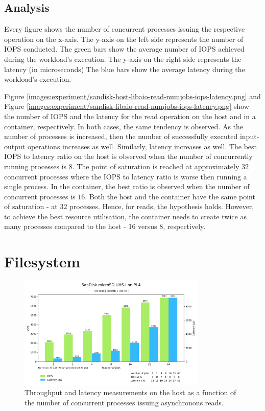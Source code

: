 \subsection{Analysis}
Every figure shows the number of concurrent processes issuing the respective operation on the 
x-axis. The y-axis on the left side represents the number of IOPS conducted. The green bars 
show the average number of IOPS achieved during the workload's execution. The y-axis on the right side 
represents the latency (in microseconds) The blue bars show the average latency during the workload's execution. 

Figure \ref{images:experiment/sandisk-host-libaio-read-numjobs-iops-latency.png} and 
Figure \ref{images:experiment/sandisk-libaio-read-numjobs-iops-latency.png} show the 
number of IOPS and the latency for the read operation on the host and in a container, respectively. 
In both cases, the same tendency is observed. As the number of processes is increased, then 
the number of successfully executed input-output operations increases as well.
Similarly, latency increases as well. The best IOPS to latency ratio on the host is observed 
when the number of concurrently running processes is $8$. The point of saturation is reached 
at approximately $32$ concurrent processes where the IOPS to latency ratio is worse then running 
a single process. In the container, the best ratio is observed when the number of concurrent 
processes is $16$. Both the host and the container have the same point of saturation - at 
$32$ processes. Hence, for reads, the hypothesis holds. However, to achieve the best 
resource utilisation, the container needs to create twice as many processes compared to the host - 16 versus 8, respectively. 



\section{Filesystem}
\label{ch:experiment/filesystem}

\begin{figure}[H]
    \centering
    \includegraphics[width=0.8\textwidth]{images/results/sandisk-host-libaio-read-numjobs-iops-latency.png}
    \caption{Throughput and latency measurements on the host as a function of the number of concurrent processes issuing asynchronous reads.}
    \label{images:fundamentals/net-ns-veth-arch.jpg}
\end{figure}

